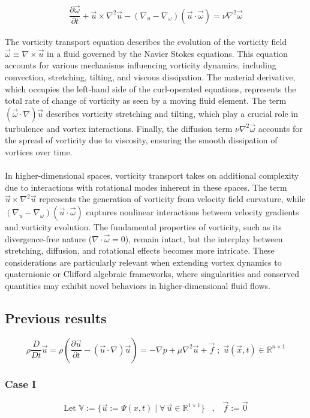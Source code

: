 \documentclass[12pt]{article}
\begin{document}
\[\frac{\partial \vec \omega}{\partial t} + \vec u \times \nabla^{2} \vec u - (\nabla_{u} - \nabla_{\omega}) ( \vec u \cdot \vec \omega) = \nu \nabla^{2} \vec \omega\]  \\ 
The vorticity transport equation describes the evolution of the vorticity field \( \vec{\omega} \equiv \nabla \times \vec{u} \) in a fluid governed by the Navier Stokes equations. This equation accounts for various mechanisms influencing vorticity dynamics, including convection, stretching, tilting, and viscous dissipation. The material derivative, which occupies the left-hand side of the curl-operated equations, represents the total rate of change of vorticity as seen by a moving fluid element. The term \( (\vec{\omega} \cdot \nabla) \vec{u} \) describes vorticity stretching and tilting, which play a crucial role in turbulence and vortex interactions. Finally, the diffusion term \( \nu \nabla^2 \vec{\omega} \) accounts for the spread of vorticity due to viscosity, ensuring the smooth dissipation of vortices over time. \\  \\
In higher-dimensional spaces, vorticity transport takes on additional complexity due to interactions with rotational modes inherent in these spaces. The term $\vec{u} \times \nabla^2 \vec{u}$ represents the generation of vorticity from velocity field curvature, while $(\nabla_u - \nabla_{\omega}) ( \vec{u} \cdot \vec{\omega})$ captures nonlinear interactions between velocity gradients and vorticity evolution. The fundamental properties of vorticity, such as its divergence-free nature (\( \nabla \cdot \vec{\omega} = 0 \)), remain intact, but the interplay between stretching, diffusion, and rotational effects becomes more intricate. These considerations are particularly relevant when extending vortex dynamics to quaternionic or Clifford algebraic frameworks, where singularities and conserved quantities may exhibit novel behaviors in higher-dimensional fluid flows.




\subsection{Previous results}

\[\rho\frac{D}{Dt}\vec u = \rho \left( \frac{\partial \vec u}{\partial t} - (\vec u \cdot \nabla )\vec u \right) = -\nabla p + \mu \nabla^{2} \vec u + \vec f \;;\; \vec u (\vec x, t) \in \mathbb{R}^{n \times 1}\]

\subsubsection {Case I}
\textbf{\[\text{Let } \mathbb{V} := \{\vec u := \Psi (x,t)\;|\;\forall \,\vec u \in \mathbb{R}^{1 \times 1} \}\;\;\;,\;\;\; \vec f := \vec 0 \]}
\end{document}
